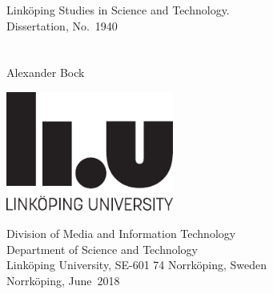 \setbirthplace{~}
\phden
{}

\def\fronttitleM{\thesistitle}
\def\fronttitleS{~}
\renewcommand{\author}{\thesisauthor} %
\newcommand{\thesismonth}{June}
\newcommand{\thesisyear}{2018}
\newcommand{\thesisno}{1940}
\newcommand{\isbn}{ISBN: 978-91-7685-291-0}
\newcommand{\issn}{ISSN: 0345-7524}


\thispagestyle{empty}

\makeatletter
\begin{center}
  \large Link{\"o}ping Studies in Science and Technology.\\
  Dissertation, No.\ \thesisno\\[8 mm]
  {\large \MakeUppercase{\fronttitleM}}\\[1 mm]
  {\large \textit{\fronttitleS}}\\[8 mm]
  {\large Alexander Bock}\\[1 cm]
\end{center}
\vfill \vspace{2cm}
\centerline{\includegraphics[width=5.5cm]{figures/logo/linkuniv_staende_eng}}
\vfill
\begin{center}
\end{center}
\vfill
\begin{center}
  Division of Media and Information Technology\\
  Department of Science and Technology\\
  Link{\"o}ping University, SE-601 74 Norrk{\"o}ping, Sweden\\[0mm]
  Norrk{\"o}ping, \thesismonth~\thesisyear
\end{center}

\clearpage